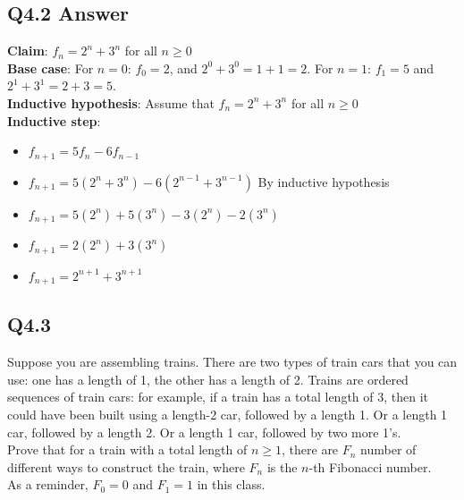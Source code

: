 \documentclass{article}
\begin{document}
\subsection*{Q4.2 Answer}
\textbf{Claim}: $f_n=2^n+3^n$ for all $n\geq0$
\\ \textbf{Base case}: For $n=0$: $f_0=2$, and $2^0+3^0=1+1=2$. For $n=1$: $f_1=5$ and $2^1+3^1=2+3=5$.
\\ \textbf{Inductive hypothesis}: Assume that $f_n=2^n+3^n$ for all $n\geq0$
\\ \textbf{Inductive step}:
\begin{itemize}[label=]
    \item $f_{n+1}=5f_n-6f_{n-1}$
    \item $f_{n+1}=5(2^n+3^n)-6(2^{n-1}+3^{n-1})$ By inductive hypothesis
    \item $f_{n+1}=5(2^n)+5(3^n)-3(2^n)-2(3^n)$
    \item $f_{n+1}=2(2^n)+3(3^n)$
    \item $f_{n+1}=2^{n+1}+3^{n+1}$
\end{itemize}
\newpage

\subsection*{Q4.3}
Suppose you are assembling trains. There are two types of train cars that you can use: one has a length of 1, the other has a length of 2. Trains are ordered sequences of train cars: for example, if a train has a total length of 3, then it could have been built using a length-2 car, followed by a length 1. Or a length 1 car, followed by a length 2. Or a length 1 car, followed by two more 1's.
\\ Prove that for a train with a total length of $n\geq1$, there are $F_n$ number of different ways to construct the train, where $F_n$ is the $n$-th Fibonacci number.
\\ As a reminder, $F_0=0$ and $F_1=1$ in this class.
\newpage
\end{document}

